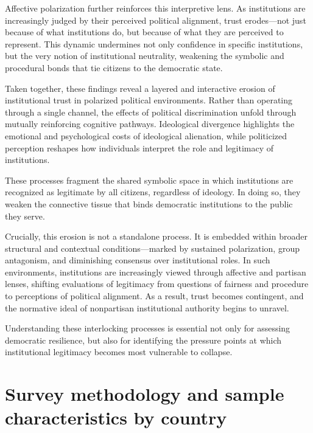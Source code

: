\documentclass{article}
\begin{document}
Affective polarization further reinforces this interpretive lens. As institutions are increasingly judged by their perceived political alignment, trust erodes—not just because of what institutions do, but because of what they are perceived to represent. This dynamic undermines not only confidence in specific institutions, but the very notion of institutional neutrality, weakening the symbolic and procedural bonds that tie citizens to the democratic state.

Taken together, these findings reveal a layered and interactive erosion of institutional trust in polarized political environments. Rather than operating through a single channel, the effects of political discrimination unfold through mutually reinforcing cognitive pathways. Ideological divergence highlights the emotional and psychological costs of ideological alienation, while politicized perception reshapes how individuals interpret the role and legitimacy of institutions.

These processes fragment the shared symbolic space in which institutions are recognized as legitimate by all citizens, regardless of ideology. In doing so, they weaken the connective tissue that binds democratic institutions to the public they serve.

Crucially, this erosion is not a standalone process. It is embedded within broader structural and contextual conditions—marked by sustained polarization, group antagonism, and diminishing consensus over institutional roles. In such environments, institutions are increasingly viewed through affective and partisan lenses, shifting evaluations of legitimacy from questions of fairness and procedure to perceptions of political alignment. As a result, trust becomes contingent, and the normative ideal of nonpartisan institutional authority begins to unravel.

Understanding these interlocking processes is essential not only for assessing democratic resilience, but also for identifying the pressure points at which institutional legitimacy becomes most vulnerable to collapse.

% 
% 
\printbibliography

\newpage
\appendix
\section{Survey methodology and sample characteristics by country}
\label{appendix:a}

\end{document}
